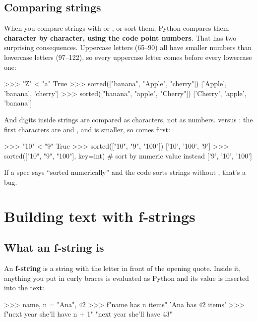 \documentclass[10pt,a4paper]{article}
\begin{document}
\subsection{Comparing strings}
When you compare strings with \code{\textless{}\allowbreak{}} or \code{\textgreater{}\allowbreak{}}, or sort them, Python compares them \textbf{character by character, using the code point numbers}. That has two surprising consequences.
Uppercase letters (65–90) all have smaller numbers than lowercase letters (97–122), so every uppercase letter comes before every lowercase one:
\begin{txtcode}
>>> "Z" < "a"
True
>>> sorted(["banana", "Apple", "cherry"])
['Apple', 'banana', 'cherry']
>>> sorted(["banana", "apple", "Cherry"])
['Cherry', 'apple', 'banana']
\end{txtcode}
And digits inside strings are compared as characters, not as numbers. \code{\textquotedbl{}10\textquotedbl{}} versus \code{\textquotedbl{}9\textquotedbl{}}: the first characters are  and , and  is smaller, so \code{\textquotedbl{}10\textquotedbl{}} comes first:
\begin{txtcode}
>>> "10" < "9"
True
>>> sorted(["10", "9", "100"])
['10', '100', '9']
>>> sorted(["10", "9", "100"], key=int)    # sort by numeric value instead
['9', '10', '100']
\end{txtcode}
If a spec says “sorted numerically” and the code sorts strings without , that’s a bug.
\setcounter{section}{3}
\section{Building text with f-strings}
\subsection{What an f-string is}
An \textbf{f-string} is a string with the letter  in front of the opening quote. Inside it, anything you put in curly braces \code{\{\}} is evaluated as Python and its value is inserted into the text:
\begin{txtcode}
>>> name, n = "Ana", 42
>>> f"{name} has {n} items"
'Ana has 42 items'
>>> f"next year she'll have {n + 1}"
"next year she'll have 43"
\end{txtcode}
\end{document}
